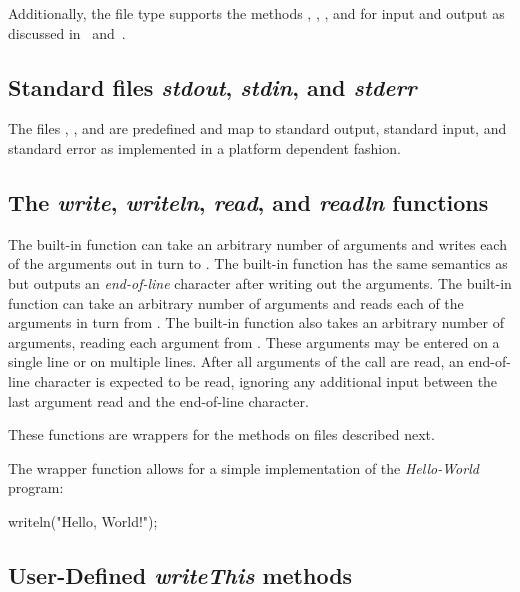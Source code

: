 Additionally, the file type supports the
methods , , , and  for 
input and output as discussed in~ and~.

\subsection{Standard files {\em stdout}, {\em stdin}, and {\em stderr}}

The files , , and  are
predefined and map to standard output, standard input, and standard
error as implemented in a platform dependent fashion.

\subsection{The {\em write}, {\em writeln}, {\em read}, and {\em readln} 
functions}

The built-in function  can take an arbitrary number of
arguments and writes each of the arguments out in turn
to .  The built-in function  has the same
semantics as  but outputs an {\em end-of-line} character
after writing out the arguments.  The built-in function 
can take an arbitrary number of arguments and reads each of the
arguments in turn from .  The built-in function 
also takes an arbitrary number of arguments, reading each argument from
.  These arguments may be entered on a single line or on multiple
lines.  After all arguments of the  call are read, an 
end-of-line character is expected to be read, ignoring any additional 
input between the last argument read and the end-of-line character.

These functions are wrappers for the methods on files described next.

\begin{example}
The  wrapper function allows for a simple implementation
of the {\em Hello-World} program:
\begin{chapel}
writeln("Hello, World!");
\end{chapel}
\end{example}

\subsection{User-Defined {\em writeThis} methods}

